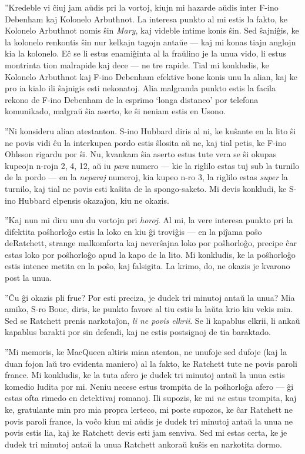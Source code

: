 ''Kredeble vi ĉiuj jam aŭdis pri la vortoj, kiujn mi hazarde aŭdis inter F-ino Debenham kaj Kolonelo Arbuthnot. La interesa punkto al mi estis la fakto, ke Kolonelo Arbuthnot nomis ŝin \emph{Mary}, kaj videble intime konis ŝin. Sed ŝajniĝis, ke la kolonelo renkontis ŝin nur kelkajn tagojn antaŭe --- kaj mi konas tiajn anglojn kia la kolonelo. Eĉ se li estus enamiĝinta al la fraŭlino je la unua vido, li estus montrinta tion malrapide kaj dece --- ne tre rapide. Tial mi konkludis, ke Kolonelo Arbuthnot kaj F-ino Debenham efektive bone konis unu la alian, kaj ke pro ia kialo ili ŝajnigis esti nekonatoj. Alia malgranda punkto estis la facila rekono de F-ino Debenham de la esprimo `longa distanco' por telefona komunikado, malgraŭ ŝia aserto, ke ŝi neniam estis en Usono.

''Ni konsideru alian atestanton. S-ino Hubbard diris al ni, ke kuŝante en la lito ŝi ne povis vidi ĉu la interkupea pordo estis ŝlosita aŭ ne, kaj tial petis, ke F-ino Ohlsson rigardu por ŝi. Nu, kvankam ŝia aserto estus tute vera se ŝi okupas kupeojn n-rojn 2, 4, 12, aŭ iu \emph{para} numero --- kie la riglilo estas tuj sub la turnilo de la pordo --- en la \emph{neparaj} numeroj, kia kupeo n-ro 3, la riglilo estas \emph{super} la turnilo, kaj tial ne povis esti kaŝita de la spongo-saketo. Mi devis konkludi, ke S-ino Hubbard elpensis okazaĵon, kiu ne okazis.

''Kaj nun mi diru unu du vortojn pri \emph{horoj}. Al mi, la vere interesa punkto pri la difektita poŝhorloĝo estis la loko en kiu ĝi troviĝis --- en la piĵama poŝo deRatchett, strange malkomforta kaj neverŝajna loko por poŝhorloĝo, precipe ĉar estas loko por poŝhorloĝo apud la kapo de la lito. Mi konkludis, ke la poŝhorloĝo estis intence metita en la poŝo, kaj falsigita. La krimo, do, ne okazis je kvarono post la unua.

''Ĉu ĝi okazis pli frue? Por esti preciza, je dudek tri minutoj antaŭ la unua? Mia amiko, S-ro Bouc, diris, ke punkto favore al tiu estis la laŭta krio kiu vekis min. Sed se Ratchett prenis narkotaĵon, \emph{li ne povis elkrii}. Se li kapablus elkrii, li ankaŭ kapablus barakti por sin defendi, kaj ne estis postsignoj de tia baraktado.

''Mi memoris, ke MacQueen altiris mian atenton, ne unufoje sed dufoje (kaj la duan fojon laŭ tro evidenta maniero) al la fakto, ke Ratchett tute ne povis paroli france. Mi konkludis, ke la tuta afero je dudek tri minutoj antaŭ la unua estis komedio ludita por mi. Neniu necese estus trompita de la poŝhorloĝa afero --- ĝi estas ofta rimedo en detektivaj romanoj. Ili supozis, ke mi \emph{ne} estus trompita, kaj ke, gratulante min pro mia propra lerteco, mi poste supozos, ke ĉar Ratchett ne povis paroli france, la voĉo kiun mi aŭdis je dudek tri minutoj antaŭ la unua ne povis estis lia, kaj ke Ratchett devis esti jam senviva. Sed mi estas certa, ke je dudek tri minutoj antaŭ la unua Ratchett ankoraŭ kuŝis en narkotita dormo.

